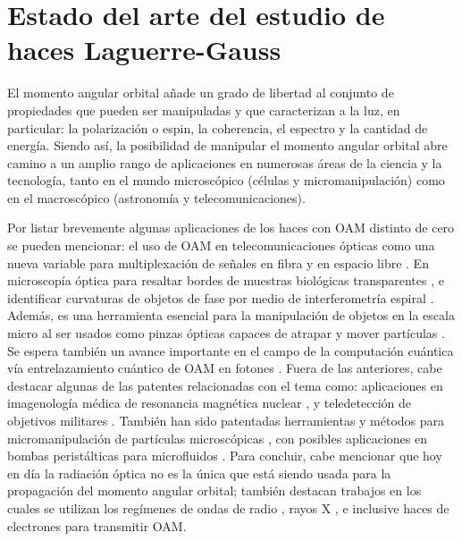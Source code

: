 

\section{Estado del arte del estudio de haces Laguerre-Gauss\label{sec:estadoArte}}

El momento angular orbital añade un grado de libertad al
conjunto de propiedades que pueden ser manipuladas y que caracterizan
a la luz, en particular: la polarización o espin, la coherencia, el
espectro y la cantidad de energía. Siendo así, la posibilidad de manipular el
momento angular orbital abre camino a un amplio rango de aplicaciones
en numerosas áreas de la ciencia y la tecnología, tanto en el mundo
microscópico (células y micromanipulación) como en el macroscópico
(astronomía y telecomunicaciones).  

Por listar brevemente algunas aplicaciones de los haces
con OAM distinto de cero se pueden mencionar: el uso de OAM en
telecomunicaciones ópticas como una nueva variable para 
multiplexación de señales en fibra y en espacio libre 
. En microscopía
óptica para resaltar bordes de muestras biológicas transparentes , e identificar
curvaturas de objetos de fase por medio de interferometría espiral
. Además, es una herramienta esencial para la
manipulación de objetos en la escala micro al ser usados como pinzas ópticas capaces
de atrapar y mover partículas . Se espera también
un avance importante en el campo de la computación cuántica vía
entrelazamiento cuántico de OAM en fotones . Fuera de
las anteriores, cabe destacar algunas de las patentes relacionadas
con el tema como: aplicaciones en imagenología médica de resonancia magnética
nuclear , y teledetección de objetivos militares
. También han sido patentadas herramientas y métodos
para micromanipulación de partículas microscópicas , con
posibles aplicaciones en bombas peristálticas para microfluidos
. Para concluir, cabe mencionar  que hoy
en día la radiación óptica no es la única que está siendo usada  
para la propagación del momento angular orbital; también destacan trabajos en
los cuales se utilizan los regímenes de ondas de radio
, rayos X , e inclusive haces de
electrones  para transmitir OAM. \\

